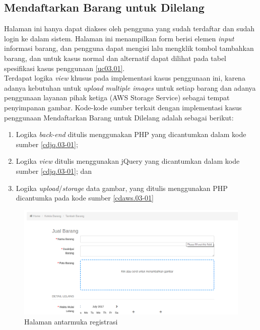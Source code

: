 \subsection{Mendaftarkan Barang untuk Dilelang}
\label{kasus-penggunaan-daftarbarang}
Halaman ini hanya dapat diakses oleh pengguna yang sudah terdaftar dan sudah login ke dalam sistem. Halaman ini menampilkan form berisi elemen \textit{input} informasi barang, dan pengguna dapat mengisi lalu mengklik tombol tambahkan barang, dan untuk kasus normal dan alternatif dapat dilihat pada tabel spesifikasi kasus penggunaan \ref{uc03.01}.\\
\indent Terdapat logika \textit{view} khusus pada implementasi kasus penggunaan ini, karena adanya kebutuhan untuk \textit{upload multiple images} untuk setiap barang dan adanya penggunaan layanan pihak ketiga (AWS Storage Service) sebagai tempat penyimpanan gambar. Kode-kode sumber terkait dengan implementasi kasus penggunaan Mendaftarkan Barang untuk Dilelang adalah sebagai berikut:
	\begin{enumerate}
		\item Logika \textit{back-end} ditulis menggunakan PHP yang dicantumkan dalam kode sumber \ref{cdjq.03-01}; 
		\item Logika \textit{view} ditulis menggunakan jQuery yang dicantumkan dalam kode sumber \ref{cdjq.03-01}; dan
		\item Logika \textit{upload}/\textit{storage} data gambar, yang ditulis menggunakan PHP dicantumka pada kode sumber \ref{cdaws.03-01}
	\end{enumerate} 

  \begin{figure}[H]
    \centering
    \includegraphics[width=\textwidth]{images/bab4/ui/03-01.png}
    \caption{Halaman antarmuka registrasi}
    \label{ui.01-01}
  \end{figure}

